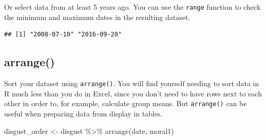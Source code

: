 \documentclass[
  oneside]{book}
\newenvironment{Shaded}{\begin{snugshade}}{\end{snugshade}}
\newcommand{\DecValTok}[1]{\textcolor[rgb]{0.00,0.00,0.81}{#1}}
\newcommand{\FunctionTok}[1]{\textcolor[rgb]{0.00,0.00,0.00}{#1}}
\newcommand{\NormalTok}[1]{#1}
\newcommand{\OtherTok}[1]{\textcolor[rgb]{0.56,0.35,0.01}{#1}}
\newcommand{\SpecialCharTok}[1]{\textcolor[rgb]{0.00,0.00,0.00}{#1}}
\begin{document}
Or select data from at least 5 years ago. You can use the \texttt{range} function to check the minimum and maximum dates in the resulting dataset.

\begin{Shaded}
\end{Shaded}

\begin{verbatim}
## [1] "2008-07-10" "2016-09-20"
\end{verbatim}

\hypertarget{arrange}{%
\subsection{arrange()}\label{arrange}}

Sort your dataset using \texttt{arrange()}. You will find yourself needing to sort data in R much less than you do in Excel, since you don't need to have rows next to each other in order to, for example, calculate group means. But \texttt{arrange()} can be useful when preparing data from display in tables.

\begin{Shaded}
\begin{Highlighting}[]
\NormalTok{disgust\_order }\OtherTok{\textless{}{-}}\NormalTok{ disgust }\SpecialCharTok{\%\textgreater{}\%}
  \FunctionTok{arrange}\NormalTok{(date, moral1)}
\end{Highlighting}
\end{Shaded}
\end{document}
